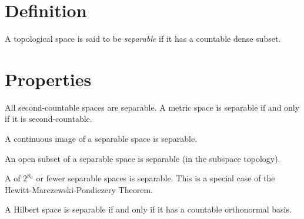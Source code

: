 \documentclass[12pt]{article}
\begin{document}
\section*{Definition}

A topological space is said to be \emph{separable}
if it has a countable dense subset.

\section*{Properties}

All second-countable spaces are separable.
A metric space is separable if and only if it is second-countable.

A continuous image of a separable space is separable.

An open subset of a separable space is separable (in the subspace topology).

A  of $2^{\aleph_0}$ or fewer separable spaces
is separable. This is a special case of the Hewitt-Marczewski-Pondiczery Theorem.

A Hilbert space is separable if and only if it has a countable orthonormal basis.
\end{document}

